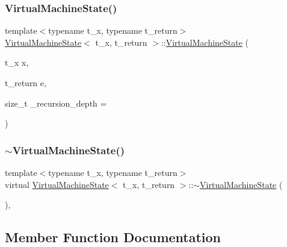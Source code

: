 \subsubsection{\texorpdfstring{Virtual\+Machine\+State()}{VirtualMachineState()}}
{\footnotesize\ttfamily template$<$typename t\+\_\+x, typename t\+\_\+return$>$ \\
\hyperlink{class_virtual_machine_state}{Virtual\+Machine\+State}$<$ t\+\_\+x, t\+\_\+return $>$\+::\hyperlink{class_virtual_machine_state}{Virtual\+Machine\+State} (\begin{DoxyParamCaption}\item[{t\+\_\+x}]{x,  }\item[{t\+\_\+return}]{e,  }\item[{size\+\_\+t}]{\+\_\+recursion\+\_\+depth = {} }\end{DoxyParamCaption})\hspace{0.3cm}{\ttfamily [inline]}}

\mbox{\label{class_virtual_machine_state_a2ad904247c9b67eb9467890d484e82a8}} 
\subsubsection{\texorpdfstring{$\sim$\+Virtual\+Machine\+State()}{~VirtualMachineState()}}
{\footnotesize\ttfamily template$<$typename t\+\_\+x, typename t\+\_\+return$>$ \\
virtual \hyperlink{class_virtual_machine_state}{Virtual\+Machine\+State}$<$ t\+\_\+x, t\+\_\+return $>$\+::$\sim$\hyperlink{class_virtual_machine_state}{Virtual\+Machine\+State} (\begin{DoxyParamCaption}{ }\end{DoxyParamCaption})\hspace{0.3cm}{\ttfamily [inline]}, {\ttfamily [virtual]}}



\subsection{Member Function Documentation}
\mbox{\label{class_virtual_machine_state_af5c8da89ae5f3ef809d22f1bf0a1147b}} 
